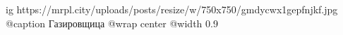  
 
 
 
 

\ifcmt
  ig https://mrpl.city/uploads/posts/resize/w/750x750/gmdycwx1gepfnjkf.jpg
	@caption Газировщица
  @wrap center
  @width 0.9
\fi
